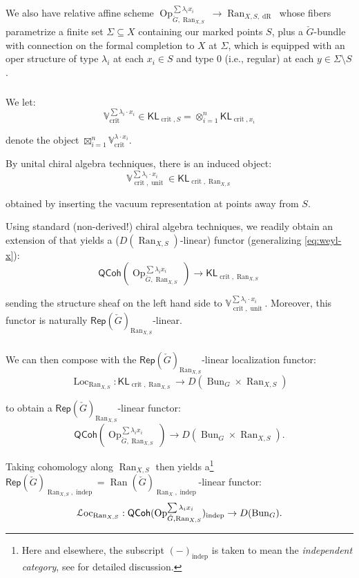 \documentclass[reqno,11pt]{amsart}
\numberwithin{equation}{subsection}
\theoremstyle{remark}
\newcommand{\Loc}{\on{Loc}}
\newcommand{\bV}{{\mathbb V}}
\newcommand{\sL}{{\EuScript L}}
\newcommand{\on}{\operatorname}
\newcommand{\Rep}{\mathsf{Rep}}
\newcommand{\Bun}{\on{Bun}}
\newcommand{\Op}{\on{Op}}
\newcommand{\QCoh}{\mathsf{QCoh}}
\renewcommand{\subset}{\subseteq}
\newcommand{\Ran}{\on{Ran}}
\newcommand{\crit}{\on{crit}}
\newcommand{\KL}{\mathsf{KL}}
\newcommand{\dR}{\on{dR}}
\begin{document}
We also have relative affine scheme 
$\Op_{\check{G},\Ran_{X,S}}^{\sum \lambda_i x_i} \to \Ran_{X,S,\dR}$ whose fibers
parametrize a finite set $\Sigma \subset X$ containing our marked points $S$,
plus a $\check{G}$-bundle with connection on the formal completion to $X$ at $\Sigma$,
which is equipped with an oper structure of type $\lambda_i$ at each $x_i \in S$
and type $0$ (i.e., regular) at each $y \in \Sigma \setminus S$.

\subsubsection{}

We let:
%
\[
\bV_{\crit}^{\sum \lambda_i\cdot x_i} \in \KL_{\crit,S} = \otimes_{i=1}^n \KL_{\crit,x_i}
\]

\noindent denote the object $\boxtimes_{i=1}^n \bV_{\crit}^{\lambda\cdot x_i}$.

By unital chiral algebra techniques, there is an induced object:
%
\[
\bV_{\crit,\on{unit}}^{\sum \lambda_i\cdot x_i} \in \KL_{\crit,\Ran_{X,S}}
\]

\noindent obtained by inserting the vacuum representation at points away from $S$.

Using standard (non-derived!) chiral algebra techniques, we readily 
obtain an extension of \cite{fg-weyl} that yields a ($D(\Ran_{X,S})$-linear) functor
(generalizing \eqref{eq:weyl-x}):
%
\begin{equation}\label{eq:weyl-ran}
\QCoh(\Op_{\check{G},\Ran_{X,S}}^{\sum \lambda_i x_i}) \to \KL_{\crit,\Ran_{X,S}}
\end{equation}

\noindent sending the structure sheaf on the left hand side to 
$\bV_{\crit,\on{unit}}^{\sum \lambda_i\cdot x_i}$. Moreover, this
functor is naturally $\Rep(\check{G})_{\Ran_{X,S}}$-linear.

\subsubsection{}

We can then compose with the $\Rep(\check{G})_{\Ran_{X,S}}$-linear localization
functor:
%
\[
\Loc_{\Ran_{X,S}}:\KL_{\crit,\Ran_{X,S}} \to D(\Bun_G \times \Ran_{X,S})
\]

\noindent to obtain a $\Rep(\check{G})_{\Ran_{X,S}}$-linear functor:
%
\[
\QCoh(\Op_{\check{G},\Ran_{X,S}}^{\sum \lambda_i x_i}) \to D(\Bun_G \times \Ran_{X,S}).
\]

\noindent Taking cohomology along $\Ran_{X,S}$ then yields 
a\footnote{Here and elsewhere, the subscript $(-)_{\on{indep}}$ is taken
to mean the \emph{independent category}, see \cite{extended-whit} for 
detailed discussion.} 
$\Rep(\check{G})_{\Ran_{X,S},\on{indep}} = \Ran(\check{G})_{\Ran_X,\on{indep}}$-linear functor:
%
\begin{equation}\label{eq:sloc}
\sL\text{oc}_{\Ran_{X,S}}:\QCoh(\Op_{\check{G},\Ran_{X,S}}^{\sum \lambda_i x_i})_{\on{indep}}
\to D(\Bun_G).
\end{equation}
\end{document}
